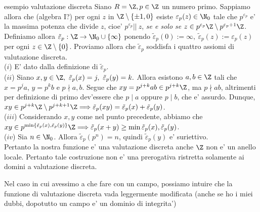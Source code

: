 \begin{example}{esempio valutazione discreta}
  Siano $R = \Z, p\in \Z$ un numero primo. Sappiamo allora che (algebra I?) per ogni $z$ in $\Z \setminus \{\pm 1, 0\}$ esiste $\varepsilon_p(z) 
  \in \N_0$ tale che $p^{\varepsilon_p}$ e' la massima potenza che divide $z$, cioe' $p^{\varepsilon_p} ||\ z$, \emph{se e solo se} 
  $z \in p^{\varepsilon_p}\Z \setminus p^{\varepsilon_p + 1}\Z$.\\

  \noindent Definiamo allora $\tilde{\varepsilon}_p : \Z \rightarrow \N_0 \cup \{\infty\}$ ponendo $\tilde{\varepsilon}_p(0) := \infty,\ 
  \tilde{\varepsilon}_p(z) := \varepsilon_p(z)$ per ogni $z \in \Z\setminus \{0\}$. Proviamo allora che $\tilde{\varepsilon}_p$ soddisfa i quattro
  assiomi di valutazione discreta. \\
  ($i$) E' dato dalla definizione di $\tilde{\varepsilon}_p$. \\
  \noindent ($ii$) Siano $x,y \in \Z,\ \tilde{\varepsilon}_p(x) = j,\ \tilde{\varepsilon}_p(y) = k.$ Allora esistono $a,b \in \Z$ tali che
  \mbox{$x = p^ja$}, $y = p^kb$ e $p \nmid a,b$. Segue che $xy = p^{j+k}ab \in p^{j+k}\Z$, ma $p \nmid ab$, altrimenti per definizione di primo dev'essere che
  $p \mid a$ oppure $p \mid b$, che e' assurdo. Dunque, $xy \in p^{j+k} \Z \setminus p^{j+k+1} \Z \Longrightarrow \tilde{\varepsilon}_p(xy) = 
  \tilde{\varepsilon}_p(x) + \tilde{\varepsilon}_p(y)$. \\
  \noindent ($iii$) Considerando $x, y$ come nel punto precedente, abbiamo che \\
  $xy \in p^{\min\{ \tilde{\varepsilon}_p(x), \tilde{\varepsilon}_p(y) \}}\Z
  \Longrightarrow \tilde{\varepsilon}_p(x+y) \geq \min{\tilde{\varepsilon}_p(x), \tilde{\varepsilon}_p(y)}$. \\
  \noindent ($iv$) Sia $n \in \N_0$. Allora $\tilde{\varepsilon}_p(p^n) = n$, quindi $\tilde{\varepsilon}_p(y)$ e' suriettivo.\\

  \noindent Pertanto la nostra funzione e' una valutazione discreta anche $\Z$ non e' un anello locale. Pertanto tale costruzione non e' una prerogativa
  ristretta solamente ai domini a valutazione discreta.
\end{example}

\noindent Nel caso in cui avessimo a che fare con un campo, possiamo intuire che la funzione di valutazione discreta vada leggermente modificata
(anche se ho i miei dubbi, dopotutto un campo e' un dominio di integrita')


